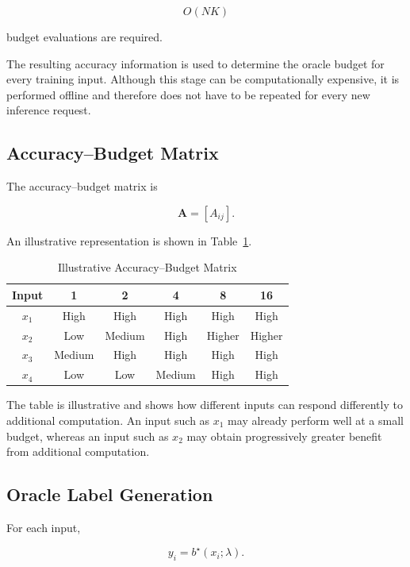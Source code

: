 \documentclass[12pt,a4paper,titlepage]{report}
\begin{document}
\begin{equation}
O(NK)
\end{equation}

budget evaluations are required.

The resulting accuracy information is used to determine the oracle budget for every training input. Although this stage can be computationally expensive, it is performed offline and therefore does not have to be repeated for every new inference request.

\subsection{Accuracy--Budget Matrix}

The accuracy--budget matrix is

\begin{equation}
\mathbf{A}
=
[A_{ij}].
\end{equation}

An illustrative representation is shown in Table~\ref{tab:utility}.

\begin{table}[H]
\centering
\caption{Illustrative Accuracy--Budget Matrix}
\label{tab:utility}
\small
\begin{tabular}{c|ccccc}
\toprule
\textbf{Input} & 1 & 2 & 4 & 8 & 16 \\
\midrule
$x_1$ & High & High & High & High & High \\
$x_2$ & Low & Medium & High & Higher & Higher \\
$x_3$ & Medium & High & High & High & High \\
$x_4$ & Low & Low & Medium & High & High \\
\bottomrule
\end{tabular}
\end{table}

The table is illustrative and shows how different inputs can respond differently to additional computation. An input such as $x_1$ may already perform well at a small budget, whereas an input such as $x_2$ may obtain progressively greater benefit from additional computation.

\subsection{Oracle Label Generation}

For each input,

\begin{equation}
y_i=b^\star(x_i;\lambda).
\end{equation}
\end{document}
